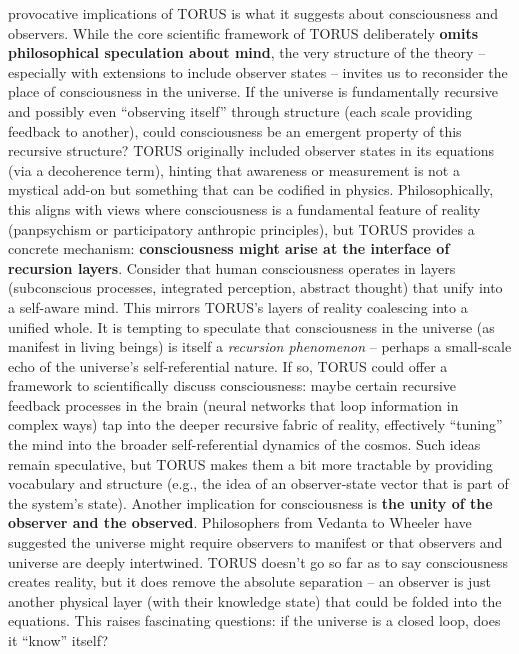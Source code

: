 \documentclass[]{article}
\begin{document}
\begin{itemize}
  provocative implications of TORUS is what it suggests about
  consciousness and observers. While the core scientific framework of
  TORUS deliberately \textbf{omits philosophical speculation about
  mind}​, the very structure of the theory -- especially with extensions
  to include observer states -- invites us to reconsider the place of
  consciousness in the universe. If the universe is fundamentally
  recursive and possibly even ``observing itself'' through structure
  (each scale providing feedback to another), could consciousness be an
  emergent property of this recursive structure? TORUS originally
  included observer states in its equations (via a decoherence term)​,
  hinting that awareness or measurement is not a mystical add-on but
  something that can be codified in physics. Philosophically, this
  aligns with views where consciousness is a fundamental feature of
  reality (panpsychism or participatory anthropic principles), but TORUS
  provides a concrete mechanism: \textbf{consciousness might arise at
  the interface of recursion layers}. Consider that human consciousness
  operates in layers (subconscious processes, integrated perception,
  abstract thought) that unify into a self-aware mind. This mirrors
  TORUS's layers of reality coalescing into a unified whole. It is
  tempting to speculate that consciousness in the universe (as manifest
  in living beings) is itself a \emph{recursion phenomenon} -- perhaps a
  small-scale echo of the universe's self-referential nature. If so,
  TORUS could offer a framework to scientifically discuss consciousness:
  maybe certain recursive feedback processes in the brain (neural
  networks that loop information in complex ways) tap into the deeper
  recursive fabric of reality, effectively ``tuning'' the mind into the
  broader self-referential dynamics of the cosmos. Such ideas remain
  speculative, but TORUS makes them a bit more tractable by providing
  vocabulary and structure (e.g., the idea of an observer-state vector
  that is part of the system's state). Another implication for
  consciousness is \textbf{the unity of the observer and the observed}.
  Philosophers from Vedanta to Wheeler have suggested the universe might
  require observers to manifest or that observers and universe are
  deeply intertwined. TORUS doesn't go so far as to say consciousness
  creates reality, but it does remove the absolute separation -- an
  observer is just another physical layer (with their knowledge state)
  that could be folded into the equations. This raises fascinating
  questions: if the universe is a closed loop, does it ``know'' itself?

\end{itemize}
\end{document}
